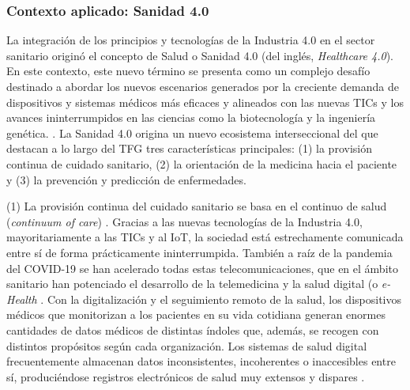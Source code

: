 
\subsubsection{Contexto aplicado: Sanidad 4.0}

La integración de los principios y tecnologías de la Industria 4.0 en el sector sanitario originó el concepto de Salud o Sanidad 4.0 (del inglés, \textit{Healthcare 4.0})\cite{tortorella2020healthcare}\cite{tortorella2021impacts}.  %
En este contexto, este nuevo término se presenta como un complejo desafío  destinado a abordar los nuevos escenarios generados por la creciente demanda de dispositivos y sistemas médicos más eficaces y alineados con las nuevas TICs y los avances ininterrumpidos en las ciencias como la biotecnología y la ingeniería genética. \cite{martin2021ehealth}. La Sanidad 4.0 origina un nuevo ecosistema interseccional del que destacan a lo largo del TFG  tres  características principales: (1) la provisión continua de cuidado sanitario, (2) la orientación de la medicina hacia el paciente y (3) la prevención y predicción de enfermedades.


(1) La provisión continua del cuidado sanitario se basa en el continuo de salud (\textit{continuum of care}) \cite{kouroubali2019new}. Gracias a las nuevas tecnologías de la Industria 4.0, mayoritariamente a las TICs y al IoT, la sociedad está estrechamente comunicada entre sí de forma prácticamente ininterrumpida. También a raíz de la pandemia del COVID-19 se han acelerado todas estas telecomunicaciones, que en el ámbito sanitario han potenciado el desarrollo de la telemedicina y la salud digital (o \textit{e-Health} \cite{martin2021ehealth}. Con la digitalización y el seguimiento remoto de la salud, los dispositivos médicos que monitorizan a los pacientes en su vida cotidiana generan enormes cantidades de datos médicos de distintas índoles que, además, se recogen con distintos propósitos según cada organización. Los sistemas de salud digital frecuentemente almacenan datos inconsistentes, incoherentes o inaccesibles entre sí, produciéndose registros electrónicos de salud muy extensos y dispares \cite{kouroubali2019new}. 


